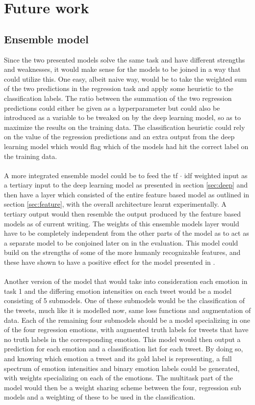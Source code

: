 
\section{Future work}

\subsection{Ensemble model}
Since the two presented models solve the same task and have different strengths and weaknesses, it would make sense for the models to be joined in a way that could utilize this. One easy, albeit naive way, would be to take the weighted sum of the two predictions in the regression task and apply some heuristic to the classification labels. The ratio between the summation of the two regression predictions could either be given as a hyperparameter but could also be introduced as a variable to be tweaked on by the deep learning model, so as to maximize the results on the training data. The classification heuristic could rely on the value of the regression predictions and an extra output from the deep learning model which would flag which of the models had hit the correct label on the training data.\\
\\
A more integrated ensemble model could be to feed the tf $\cdot$ idf weighted input as a tertiary input to the deep learning model as presented in section \ref{sec:deep} and then have a layer which consisted of the entire feature based model as outlined in section \ref{sec:feature}, with the overall architecture learnt experimentally. A tertiary output would then resemble the output produced by the feature based models as of current writing. The weights of this ensemble models layer would have to be completely independent from the other parts of the model as to act as a separate model to be conjoined later on in the evaluation. This model could build on the strengths of some of the more humanly recognizable features, and these have shown to have a positive effect for the model presented in \cite{ims}.\\
\\
Another version of the model that would take into consideration each emotion in task 1 and the differing emotion intensities on each tweet would be a model consisting of 5 submodels. One of these submodels would be the classification of the tweets, much like it is modelled now, same loss functions and augmentation of data. Each of the remaining four submodels should be a model specializing in one of the four regression emotions, with augmented truth labels for tweets that have no truth labels in the corresponding emotion. This model would then output a prediction for each emotion and a classification list for each tweet. By doing so, and knowing which emotion a tweet and its gold label is representing, a full spectrum of emotion intensities and binary emotion labels could be generated, with weights specializing on each of the emotions. The multitask part of the model would then be a weight sharing scheme between the four, regression sub models and a weighting of these to be used in the classification.

